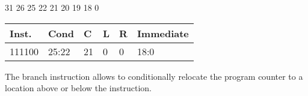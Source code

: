 \documentclass[12pt]{article}
\begin{document}
    \hspace{1.6cm}31 \hspace{1.15cm}26 \hspace{.05cm}25 \hspace{.8cm}22 \hspace{.1cm}21 \hspace{.2cm}20 \hspace{.2cm}19 \hspace{.1cm}18 \hspace{6.1cm}0
    \vspace{-.25cm}
    \begin{center}
        \begin{tabular}{ |p{1.8cm}|p{1.5cm}|p{.3cm}|p{.3cm}|p{.3cm}|p{6.5cm}| }
            \hline
            \textbf{Inst.} & \textbf{Cond} &  \textbf{C} & \textbf{L}&\textbf{R}&\textbf{Immediate}\\
            \hline
            111100& 25:22 & 21 & 0 & 0 &18:0\\
            \hline
        \end{tabular}
    \end{center}
    
    \noindent
    The branch instruction allows to conditionally relocate the program counter to a location above or below the instruction.
    
\end{document}
